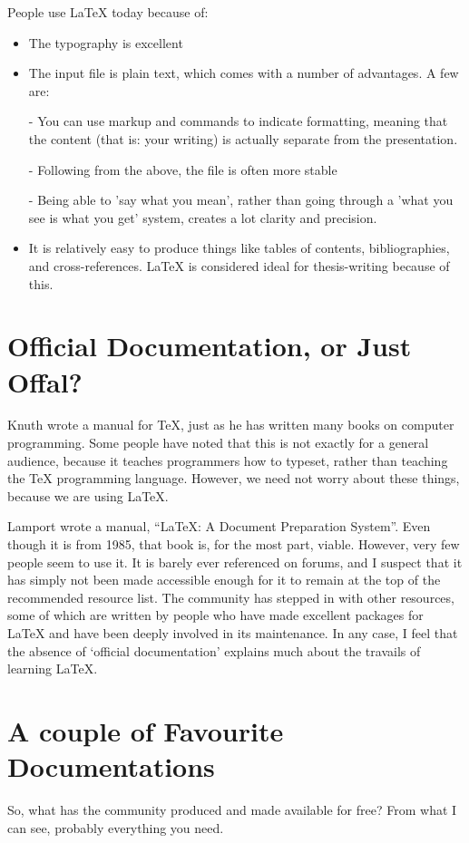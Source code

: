 \documentclass[11pt, oneside]{memoir}
\begin{document}
People use LaTeX today because of:
\begin{itemize}
    \item The typography is excellent
    \item The input file is plain text, which comes with a number of advantages. A few are:
    \item[-] You can use markup and commands to indicate formatting, meaning that the content (that is: your writing) is actually separate from the presentation.
    \item[-] Following from the above, the file is often more stable
    \item[-] Being able to 'say what you mean', rather than going through a 'what you see is what you get' system, creates a lot clarity and precision.
    \item It is relatively easy to produce things like tables of contents, bibliographies, and cross-references. LaTeX is considered ideal for thesis-writing because of this.
\end{itemize}

\section*{Official Documentation, or Just Offal?}

Knuth wrote a manual for TeX, just as he has written many books on computer programming. Some people have noted that this is not exactly for a general audience, because it teaches programmers how to typeset, rather than teaching the TeX programming language. However, we need not worry about these things, because we are using LaTeX.

Lamport wrote a manual, ``LaTeX: A Document Preparation System''. Even though it is from 1985, that book is, for the most part, viable. However, very few people seem to use it. It is barely ever referenced on forums, and I suspect that it has simply not been made accessible enough for it to remain at the top of the recommended resource list. The community has stepped in with other resources, some of which are written by people who have made excellent packages for LaTeX and have been deeply involved in its maintenance. In any case, I feel that the absence of `official documentation' explains much about the travails of learning LaTeX.

\section{A couple of Favourite Documentations}
So, what has the community produced and made available for free? From what I can see, probably everything you need.
\end{document}
